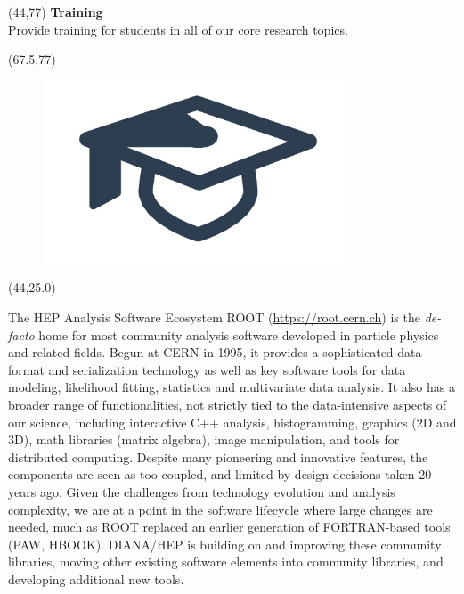 \documentclass[final]{beamer}
\begin{document}
\begin{frame}{}
\begin{textblock}{22.5}(44,77)
\textcolor{mybluelabel}{\bf Training} \\
Provide training for students in all of our core research topics.
\end{textblock}

\begin{textblock}{12.5}(67.5,77)
\begin{figure}[tbph]
\centering
\includegraphics[width=0.8\textwidth]{training.jpg}
\end{figure}
\end{textblock}





\begin{textblock}{38.0}(44,25.0)
\begin{block}{The HEP Analysis Software Ecosystem}
ROOT (\url{https://root.cern.ch}) is
the {\em de-facto} home for most community analysis
software developed in particle physics and related fields. Begun at CERN in 1995,
it provides a sophisticated data format and serialization technology
as well as key software tools for
data modeling, likelihood fitting, statistics and
multivariate data analysis. It also has a broader range of
functionalities, not strictly tied to the data-intensive aspects
of our science, including interactive C++ analysis, histogramming,
graphics (2D and 3D), math libraries (matrix algebra), image manipulation,
and tools for distributed computing. Despite many pioneering and
innovative features, the components are seen as too coupled,
and limited by design decisions taken 20 years ago.
Given the challenges from technology evolution and analysis complexity,
we are at a point in the software lifecycle where large changes are needed,
much as ROOT replaced an earlier generation of
FORTRAN-based tools (PAW, HBOOK).
DIANA/HEP is building on and improving these
community libraries, moving other existing software elements into
community libraries, and developing additional new tools.
\end{block}
\end{textblock}




\end{frame}
\end{document}
